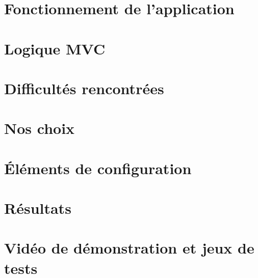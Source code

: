 \section{Fonctionnement de l'application}


\section{Logique MVC}


\section{Difficultés rencontrées} 

\section{Nos choix}

\section{Éléments de configuration}

\section{Résultats}

\section{Vidéo de démonstration et jeux de tests}
